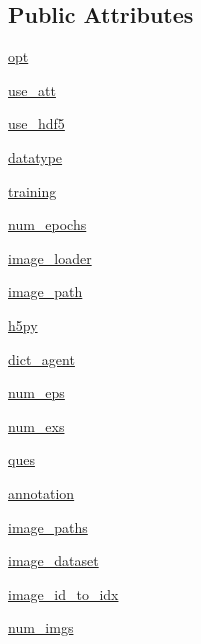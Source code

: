\subsection*{Public Attributes}
\begin{DoxyCompactItemize}
\item 
\hyperlink{classparlai_1_1tasks_1_1vqa__v1_1_1agents_1_1VQADataset_a0af1b5bdd7f93896ab44f4d90be56fdf}{opt}
\item 
\hyperlink{classparlai_1_1tasks_1_1vqa__v1_1_1agents_1_1VQADataset_a540351e537ae43b050ed7ff36e791cdc}{use\+\_\+att}
\item 
\hyperlink{classparlai_1_1tasks_1_1vqa__v1_1_1agents_1_1VQADataset_a910f7bdc353cc316e3111ec610fe72de}{use\+\_\+hdf5}
\item 
\hyperlink{classparlai_1_1tasks_1_1vqa__v1_1_1agents_1_1VQADataset_ae0d953b70e4f0b495a557a2255ebd6a9}{datatype}
\item 
\hyperlink{classparlai_1_1tasks_1_1vqa__v1_1_1agents_1_1VQADataset_aea682e12a18a8735242fe87a153be577}{training}
\item 
\hyperlink{classparlai_1_1tasks_1_1vqa__v1_1_1agents_1_1VQADataset_abb937fcd102aea9443e8bfd0907093f5}{num\+\_\+epochs}
\item 
\hyperlink{classparlai_1_1tasks_1_1vqa__v1_1_1agents_1_1VQADataset_aa800c6844818d22fc32903d512e7d9ab}{image\+\_\+loader}
\item 
\hyperlink{classparlai_1_1tasks_1_1vqa__v1_1_1agents_1_1VQADataset_a479628f7fc35bd099d3d2b97731f7d60}{image\+\_\+path}
\item 
\hyperlink{classparlai_1_1tasks_1_1vqa__v1_1_1agents_1_1VQADataset_a09076b5777f6582f15de887cdf5c6872}{h5py}
\item 
\hyperlink{classparlai_1_1tasks_1_1vqa__v1_1_1agents_1_1VQADataset_a2f406d1ee283616a5869937aaea1abe0}{dict\+\_\+agent}
\item 
\hyperlink{classparlai_1_1tasks_1_1vqa__v1_1_1agents_1_1VQADataset_a301c651bc49072c24826e5d6785be448}{num\+\_\+eps}
\item 
\hyperlink{classparlai_1_1tasks_1_1vqa__v1_1_1agents_1_1VQADataset_a7ae2ca8f929d1a04605a79dcf47ae66b}{num\+\_\+exs}
\item 
\hyperlink{classparlai_1_1tasks_1_1vqa__v1_1_1agents_1_1VQADataset_a1c5d9762b63c5cf100fe7cbf5c23e68e}{ques}
\item 
\hyperlink{classparlai_1_1tasks_1_1vqa__v1_1_1agents_1_1VQADataset_aa326215f8c63be2e137cad09cafd7c3d}{annotation}
\item 
\hyperlink{classparlai_1_1tasks_1_1vqa__v1_1_1agents_1_1VQADataset_abf93afc18920fbcda9fb752cd9a9ffd3}{image\+\_\+paths}
\item 
\hyperlink{classparlai_1_1tasks_1_1vqa__v1_1_1agents_1_1VQADataset_a0877093e5a2a4f68af98100bfdf6113c}{image\+\_\+dataset}
\item 
\hyperlink{classparlai_1_1tasks_1_1vqa__v1_1_1agents_1_1VQADataset_afc85573aa326311120ce449284675bc4}{image\+\_\+id\+\_\+to\+\_\+idx}
\item 
\hyperlink{classparlai_1_1tasks_1_1vqa__v1_1_1agents_1_1VQADataset_a81a7563d63356706c61e51a188e09c4f}{num\+\_\+imgs}
\end{DoxyCompactItemize}


